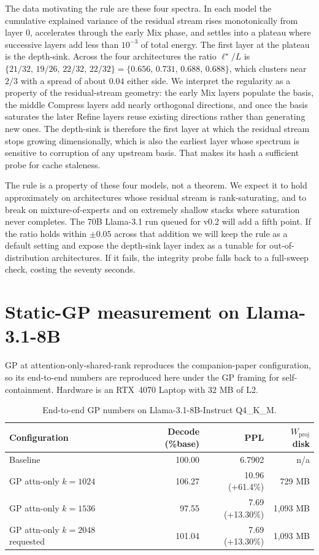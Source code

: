 \documentclass[11pt]{article}
\begin{document}
The data motivating the rule are these four spectra. In each model the
cumulative explained variance of the residual stream rises monotonically
from layer $0$, accelerates through the early Mix phase, and settles
into a plateau where successive layers add less than $10^{-3}$ of
total energy. The first layer at the plateau is the depth-sink. Across
the four architectures the ratio $\ell^\star/L$ is
$\{21/32,\,19/26,\,22/32,\,22/32\}=\{0.656,\,0.731,\,0.688,\,0.688\}$,
which clusters near $2/3$ with a spread of about $0.04$ either side.
We interpret the regularity as a property of the residual-stream
geometry: the early Mix layers populate the basis, the middle Compress
layers add nearly orthogonal directions, and once the basis saturates
the later Refine layers reuse existing directions rather than
generating new ones. The depth-sink is therefore the first layer at
which the residual stream stops growing dimensionally, which is also
the earliest layer whose spectrum is sensitive to corruption of any
upstream basis. That makes its hash a sufficient probe for cache
staleness.

The rule is a property of these four models, not a theorem. We expect
it to hold approximately on architectures whose residual stream is
rank-saturating, and to break on mixture-of-experts and on extremely
shallow stacks where saturation never completes. The 70B Llama-3.1
run queued for v0.2 will add a fifth point. If the ratio holds within
$\pm 0.05$ across that addition we will keep the rule as a default
setting and expose the depth-sink layer index as a tunable for
out-of-distribution architectures. If it fails, the integrity probe
falls back to a full-sweep check, costing the seventy seconds.

\section{Static-GP measurement on Llama-3.1-8B}
\label{sec:anchor}
GP at attention-only-shared-rank reproduces the companion-paper
configuration, so its end-to-end numbers are reproduced here under the
GP framing for self-containment. Hardware is an RTX~4070 Laptop with
$32$ MB of L2.

\begin{table}[h]\centering\small
\caption{End-to-end GP numbers on Llama-3.1-8B-Instruct Q4\_K\_M.}
\begin{tabular}{@{}lrrr@{}}
\toprule
Configuration & Decode (\%base) & PPL & $W_\text{proj}$ disk \\
\midrule
Baseline & 100.00 & 6.7902 & n/a \\
GP attn-only $k{=}1024$ & 106.27 & 10.96 (+61.4\%) & 729 MB \\
GP attn-only $k{=}1536$ & 97.55  & 7.69 (+13.30\%) & 1{,}093 MB \\
GP attn-only $k{=}2048$ requested & 101.04 & 7.69 (+13.30\%) & 1{,}093 MB \\
\bottomrule
\end{tabular}
\end{table}
\end{document}
